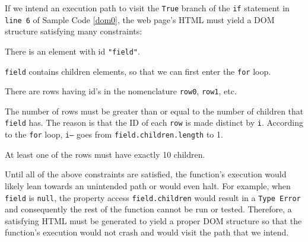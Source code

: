 

If we intend an execution path to visit the {\tt True} branch of the {\tt if} statement in {\tt line 6} of Sample Code \ref{dom0}, the web page's HTML must yield a DOM structure satisfying many constraints:
\begin {compactitem}
\item There is an element with id {\tt "field"}.
\item {\tt field} contains children elements, so that we can first enter the {\tt for} loop.
\item There are rows having id's in the nomenclature {\tt row0}, {\tt row1}, etc.
\item The number of rows must be greater than or equal to the number of children that {\tt field} has.  The reason is that the ID of each {\tt row} is made distinct by {\tt i}.  According to the {\tt for} loop, {\tt i---} goes from {\tt field.children.length} to 1.
\item At least one of the rows must have exactly 10 children.
\end {compactitem}

Until all of the above constraints are satisfied, the function's execution would likely lean towards an unintended path or would even halt.   
For example, when {\tt field} is {\tt null}, the property access {\tt field.children} would result in a {\tt Type Error} and consequently the rest of the function cannot be run or tested.  
Therefore, a satisfying HTML must be generated to yield a proper DOM structure so that the function's execution would not crash and would visit the path that we intend.

